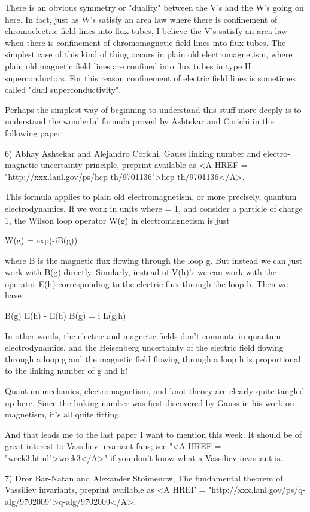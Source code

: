 There is an obvious symmetry or "duality" between the V's and the W's
going on here.  In fact, just as W's satisfy an area law where there
is confinement of chromoelectric field lines into flux tubes, I
believe the V's satisfy an area law when there is confinement of
chromomagnetic field lines into flux tubes.  The simplest case of this
kind of thing occurs in plain old electromagnetism, where plain old
magnetic field lines are confined into flux tubes in type II
superconductors.  For this reason confinement of electric field lines
is sometimes called "dual superconductivity".

Perhaps the simplest way of beginning to understand this stuff more
deeply is to understand the wonderful formula proved by Ashtekar and
Corichi in the following paper:

6) Abhay Ashtekar and Alejandro Corichi, Gauss linking number and
electro-magnetic uncertainty principle, preprint available as 
<A HREF = "http://xxx.lanl.gov/ps/hep-th/9701136">hep-th/9701136</A>.

This formula applies to plain old electromagnetism, or more precisely,
quantum electrodynamics.  If we work in units where \hbar  = 1, and
consider a particle of charge 1, the Wilson loop operator W(g) in
electromagnetism is just

W(g) = exp(-iB(g)) 

where B is the magnetic flux flowing through the loop g.  But instead
we can just work with B(g) directly.  Similarly, instead of V(h)'s
we can work with the operator E(h) corresponding to the electric flux
through the loop h.  Then we have

B(g) E(h) - E(h) B(g) = i L(g,h)

In other words, the electric and magnetic fields don't commute in
quantum electrodynamics, and the Heisenberg uncertainty of the
electric field flowing through a loop g and the magnetic field flowing
through a loop h is proportional to the linking number of g and h!

Quantum mechanics, electromagnetism, and knot theory are clearly quite
tangled up here.  Since the linking number was first discovered by
Gauss in his work on magnetism, it's all quite fitting.  

And that leads me to the last paper I want to mention this week.  It
should be of great interest to Vassiliev invariant fans; see "<A HREF = "week3.html">week3</A>"
if you don't know what a Vassiliev invariant is.

7) Dror Bar-Natan and Alexander Stoimenow, The fundamental theorem of 
Vassiliev invariants, preprint available as <A HREF = "http://xxx.lanl.gov/ps/q-alg/9702009">q-alg/9702009</A>.

